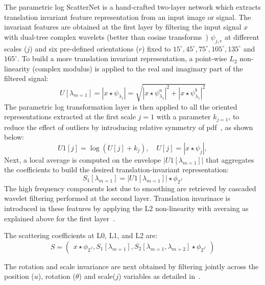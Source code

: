 \documentclass[10pt,twocolumn,letterpaper]{article}
\begin{document}
The parametric log ScatterNet is a hand-crafted two-layer network which extracts translation invariant feature representation from an input image or signal. The invariant features are obtained at the first layer by filtering the input signal $x$ with dual-tree complex wavelets (better than cosine transforms~\cite{wavdct}) $ \psi_{j,r }$ at different scales ($j$) and six pre-defined orientations ($r$) fixed to $15^\circ, 45^\circ, 75^\circ, 105^\circ, 135^\circ$ and $165^\circ$. To build a more translation invariant representation, a point-wise $L_{2}$ non-linearity (complex modulus) is applied to the real and imaginary part of the filtered signal:
\begin{equation}
U[\lambda_{m = 1}] = |x\star \psi_{\lambda_{1} }| = \sqrt{|x\star \psi_{\lambda_{1} }^{a}|^2 + |x\star \psi_{\lambda_{1} }^{b}|^2} 
\end{equation}
The parametric log transformation layer is then applied to all the oriented representations extracted at the first scale $j=1$ with a parameter $k_{j=1}$, to reduce the effect of outliers by introducing relative symmetry of pdf~\cite{singh}, as shown below: 
\begin{equation}
U1[j] = \log(U[j] + k_{j}), \quad U[j] = |x\star \psi_{j}|, 
\end{equation}
Next, a local average is computed on the envelope $|U1[\lambda_{m = 1}]|$ that aggregates the coefficients to build the desired translation-invariant representation: 
\begin{equation}
S_{1}[\lambda_{m = 1}] = |U1[\lambda_{m = 1}]| \star \phi_{2^J}
\end{equation}
The high frequency components lost due to smoothing are retrieved by cascaded wavelet filtering performed at the second layer. Translation invarinace is introduced in these features by applying the L2 non-linearity with averaing as explained above for the first layer~\cite{singh}.

The scattering coefficients at L0, L1, and L2 are:
\vspace{-0.3em}
\begin{equation}
S = \begin{pmatrix}
x \star \phi_{2^J},
S_{1}[\lambda_{m = 1}],S_{2}[\lambda_{m = 1},\lambda_{m = 2}] \star \phi_{2^J}
\end{pmatrix}
\end{equation} 

The rotation and scale invariance are next obtained by filtering jointly across the position ($u$), rotation ($\theta$) and scale($j$) variables as detailed in~\cite{sifre2013}. 
\end{document}
